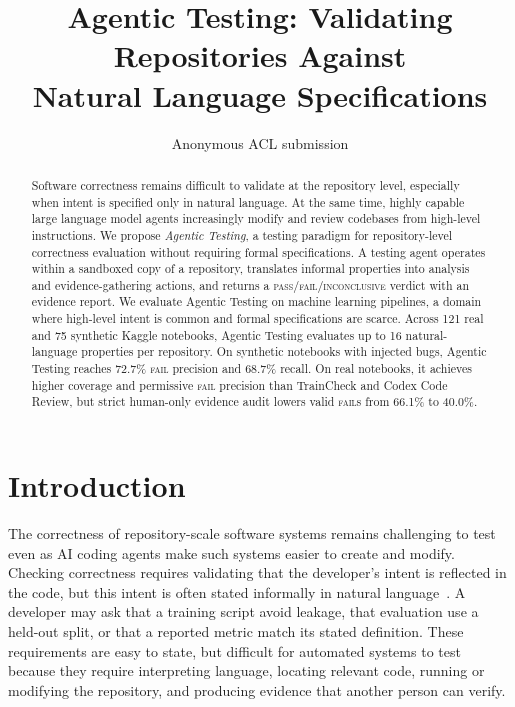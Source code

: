 \documentclass[11pt]{article}
\title{Agentic Testing: Validating Repositories Against\\Natural Language Specifications}
\author{Anonymous ACL submission}
\begin{document}
\maketitle

\begin{abstract}
Software correctness remains difficult to validate at the repository level, especially when intent is specified only in natural language.
At the same time, highly capable large language model agents increasingly modify and review codebases from high-level instructions.
We propose \emph{Agentic Testing}, a testing paradigm for repository-level correctness evaluation without requiring formal specifications.
A testing agent operates within a sandboxed copy of a repository, translates informal properties into analysis and evidence-gathering actions, and returns a \textsc{pass}/\textsc{fail}/\textsc{inconclusive} verdict with an evidence report.
We evaluate Agentic Testing on machine learning pipelines, a domain where high-level intent is common and formal specifications are scarce.
Across 121 real and 75 synthetic Kaggle notebooks, Agentic Testing evaluates up to 16 natural-language properties per repository.
On synthetic notebooks with injected bugs, Agentic Testing reaches 72.7\% \textsc{fail} precision and 68.7\% recall.
On real notebooks, it achieves higher coverage and permissive \textsc{fail} precision than TrainCheck and Codex Code Review, but strict human-only evidence audit lowers valid \textsc{fail}s from 66.1\% to 40.0\%.
\end{abstract}

\section{Introduction}

The correctness of repository-scale software systems remains challenging to test even as AI coding agents make such systems easier to create and modify.
Checking correctness requires validating that the developer's intent is reflected in the code, but this intent is often stated informally in natural language~\citep{zeller2009why}.
A developer may ask that a training script avoid leakage, that evaluation use a held-out split, or that a reported metric match its stated definition.
These requirements are easy to state, but difficult for automated systems to test because they require interpreting language, locating relevant code, running or modifying the repository, and producing evidence that another person can verify.
\end{document}
